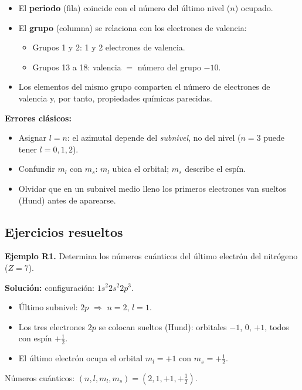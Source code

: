 \documentclass[12pt, letterpaper]{article}
\begin{document}
\begin{cuadroteoria}
  \begin{itemize}[leftmargin=*]
    \item El \textbf{periodo} (fila) coincide con el número del último nivel ($n$) ocupado.
    \item El \textbf{grupo} (columna) se relaciona con los electrones de valencia:
          \begin{itemize}[leftmargin=*]
            \item Grupos 1 y 2: 1 y 2 electrones de valencia.
            \item Grupos 13 a 18: valencia $= $ número del grupo $- 10$.
          \end{itemize}
    \item Los elementos del mismo grupo comparten el número de electrones de valencia y, por tanto, propiedades químicas parecidas.
  \end{itemize}
\end{cuadroteoria}

\begin{cuadroadvertencia}
  \textbf{Errores clásicos:}
  \begin{itemize}[leftmargin=*]
    \item Asignar $l = n$: el azimutal depende del \emph{subnivel}, no del nivel ($n = 3$ puede tener $l = 0, 1, 2$).
    \item Confundir $m_l$ con $m_s$: $m_l$ ubica el orbital; $m_s$ describe el espín.
    \item Olvidar que en un subnivel medio lleno los primeros electrones van sueltos (Hund) antes de aparearse.
  \end{itemize}
\end{cuadroadvertencia}

\subsection{Ejercicios resueltos}

\textbf{Ejemplo R1.} Determina los números cuánticos del último electrón del nitrógeno ($Z = 7$).

\begin{cuadrosolucion}
  \textbf{Solución:} configuración: $1s^{2}2s^{2}2p^{3}$.
  \begin{itemize}
    \item Último subnivel: $2p$ $\Rightarrow$ $n = 2$, $l = 1$.
    \item Los tres electrones $2p$ se colocan sueltos (Hund): orbitales $-1$, $0$, $+1$, todos con espín $+\tfrac{1}{2}$.
    \item El último electrón ocupa el orbital $m_l = +1$ con $m_s = +\tfrac{1}{2}$.
  \end{itemize}
  Números cuánticos: $(n, l, m_l, m_s) = (2, 1, +1, +\tfrac{1}{2})$.
\end{cuadrosolucion}
\end{document}
